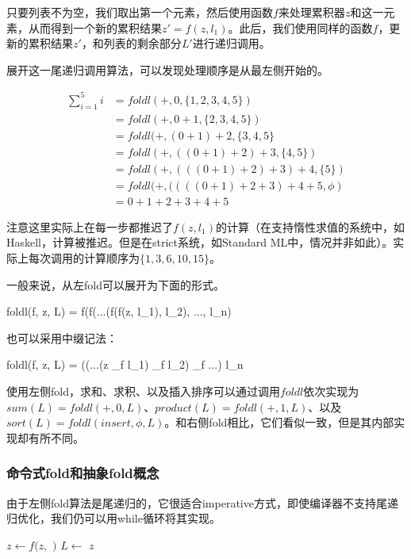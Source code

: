 \documentclass[UTF8]{article}
\begin{document}
只要列表不为空，我们取出第一个元素，然后使用函数$f$来处理累积器$z$和这一元素，从而得到一个新的累积结果$z' = f(z, l_1)$。此后，我们使用同样的函数$f$，更新的累积结果$z'$，和列表的剩余部分$L'$进行递归调用。

展开这一尾递归调用算法，可以发现处理顺序是从最左侧开始的。

\[
\begin{array}{rl}
\sum_{i=1}^{5}i & = foldl(+, 0, \{1, 2, 3, 4, 5\}) \\
                & = foldl(+, 0 + 1, \{ 2, 3, 4, 5 \}) \\
                & = foldl(+, (0 + 1) + 2, \{3, 4, 5 \} \\
                & = foldl(+, ((0 + 1) + 2) + 3, \{4, 5\}) \\
                & = foldl(+, (((0 + 1) + 2) + 3) + 4, \{5\}) \\
                & = foldl(+, ((((0 + 1) + 2 + 3) + 4 + 5, \phi) \\
                & = 0 + 1 + 2 + 3 + 4 + 5
\end{array}
\]

注意这里实际上在每一步都推迟了$f(z, l_1)$的计算（在支持惰性求值的系统中，如Haskell，计算被推迟。但是在strict系统，如Standard ML中，情况并非如此）。实际上每次调用的计算顺序为$\{ 1, 3, 6, 10, 15\}$。

一般来说，从左fold可以展开为下面的形式。

\be
foldl(f, z, L) = f(f(...(f(f(z, l_1), l_2), ..., l_n)
\ee

也可以采用中缀记法：

\be
foldl(f, z, L) = ((...(z \oplus_f l_1) \oplus_f l_2) \oplus_f ...) \oplus l_n
\ee

使用左侧fold，求和、求积、以及插入排序可以通过调用$foldl$依次实现为$sum(L) = foldl(+, 0, L)$、$product(L) = foldl(+, 1, L)$、以及$sort(L) = foldl(insert, \phi, L)$。和右侧fold相比，它们看似一致，但是其内部实现却有所不同。

\subsubsection{命令式fold和抽象fold概念}

由于左侧fold算法是尾递归的，它很适合imperative方式，即使编译器不支持尾递归优化，我们仍可以用while循环将其实现。

\begin{algorithmic}[1]
    \State $z \gets f(z, $  $)$
    \State $L \gets$ 
  \EndWhile
  \State \Return $z$
\EndFunction
\end{algorithmic}
\end{document}
